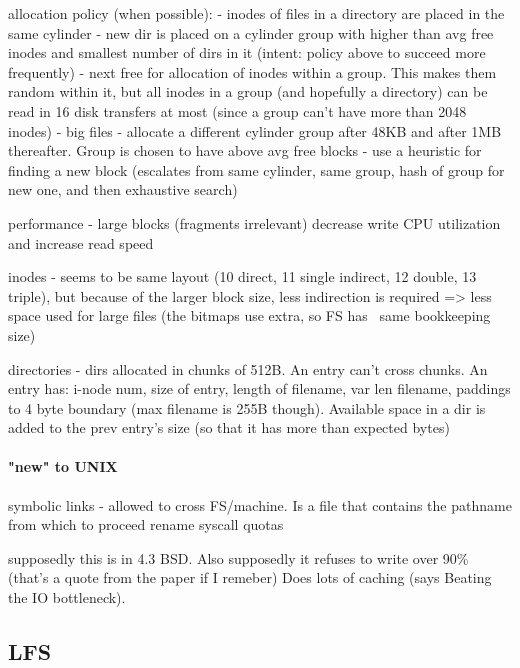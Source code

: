 \documentclass[a4paper]{report}
\begin{document}
        allocation policy (when possible):
            - inodes of files in a directory are placed in the same cylinder
            - new dir is placed on a cylinder group with higher than avg free
              inodes and smallest number of dirs in it (intent: policy above to
              succeed more frequently)
            - next free for allocation of inodes within a group. This makes
              them random within it, but all inodes in a group (and hopefully a
              directory) can be read in 16 disk transfers at most (since a group
              can't have more than 2048 inodes)
            - big files - allocate a different cylinder group after 48KB and
              after 1MB thereafter. Group is chosen to have above avg free blocks
            - use a heuristic for finding a new block (escalates from same
              cylinder, same group, hash of group for new one, and then
              exhaustive search)

        performance - large blocks (fragments irrelevant) decrease write CPU
        utilization and increase read speed

        inodes - seems to be same layout (10 direct, 11 single indirect, 12
        double, 13 triple), but because of the larger block size, less
        indirection is required => less space used for large files
        (the bitmaps use extra, so FS has ~same bookkeeping size)

        directories - dirs allocated in chunks of 512B. An entry can't cross
        chunks. An entry has: i-node num, size of entry, length of filename,
        var len filename, paddings to 4 byte boundary (max filename is 255B
        though). Available space in a dir is added to the prev entry's size (so
        that it has more than expected bytes)

        \paragraph{"new" to UNIX}
        symbolic links - allowed to cross FS/machine. Is a file that contains
        the pathname from which to proceed
        rename syscall
        quotas

        supposedly this is in 4.3 BSD. Also supposedly it refuses to write over
        90\% (that's a quote from the paper if I remeber)
        Does lots of caching (says Beating the IO bottleneck).

    \subsection{LFS}
\end{document}
